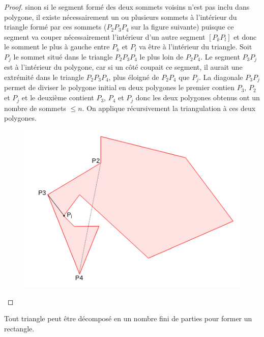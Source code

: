 \begin{proof}
\noindent
sinon si le segment formé des deux sommets voisins n'est pas inclu dans polygone, il existe nécessairement un ou plusieurs sommets à
l'intérieur du triangle formé par ces sommets ($P_2P_3P_4$ sur la figure suivante) puisque ce segment va couper nécessairement l'intérieur d'un autre segment $[P_kP_l]$ et donc le somment le plus à gauche entre $P_k$ et $P_l$ va être à l'intérieur du triangle. Soit $P_j$ le sommet situé dans le triangle $P_2P_3P_4$ le plus loin de $P_2P_4$. Le segment $P_3P_j$ est à l'intérieur du polygone, car si un côté coupait ce segment, il aurait une extrémité dans le triangle $P_2P_3P_4$, plus éloigné de $P_2P_4$ que $P_j$.
La diagonale $P_3P_j$ permet de diviser le polygone initial en deux polygones le premier contien $P_3$, $P_2$ et $P_j$ et le deuxième contient $P_3$, $P_4$ et $P_j$ donc les deux polygones obtenus ont un nombre de sommets $\le n$. On applique récursivement la triangulation à ces deux polygones.

  \begin{figure}[h]
      \centering
      \includegraphics[scale=0.6]{images/x6.png}

  \end{figure}
\end{proof}
\begin{li}
  Tout triangle peut être décomposé en un nombre fini de parties pour former un rectangle.
\end{li}
